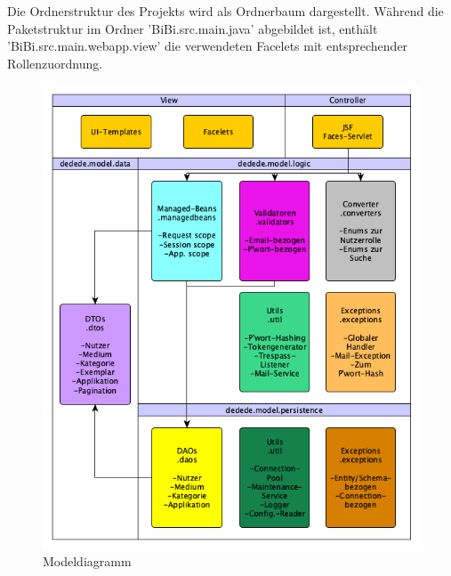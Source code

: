 \documentclass{article}
\begin{document}
Die Ordnerstruktur des Projekts wird als Ordnerbaum dargestellt.
Während die Paketstruktur im Ordner 'BiBi.src.main.java' abgebildet ist, enthält 'BiBi.src.main.webapp.view' die verwendeten Facelets mit entsprechender Rollenzuordnung. \vspace{0.5em}

\begin{figure}[H]
\centering
\includegraphics[width = 40em]{Modeldiagramm}
\caption{Modeldiagramm}
\end{figure}
\end{document}
